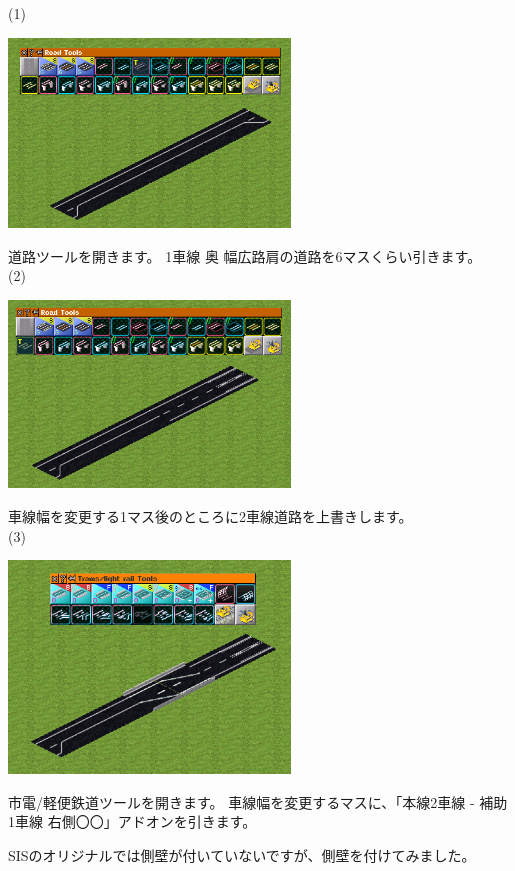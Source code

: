 \documentclass{jbook}
\begin{document}
\begin{multicols}{2}

  (1)

\includegraphics[width = 75mm]{picture/20210214-road-4-1.png}

道路ツールを開きます。
1車線 奥 幅広路肩の道路を6マスくらい引きます。\\


(2)

\includegraphics[width = 75mm]{picture/20210214-road-4-2.png}

車線幅を変更する1マス後のところに2車線道路を上書きします。\\


(3)

\includegraphics[width = 75mm]{picture/20210214-road-4-3.png}

市電/軽便鉄道ツールを開きます。
車線幅を変更するマスに、「本線2車線 - 補助1車線 右側〇〇」アドオンを引きます。

SISのオリジナルでは側壁が付いていないですが、側壁を付けてみました。\\


\end{multicols}
\end{document}
